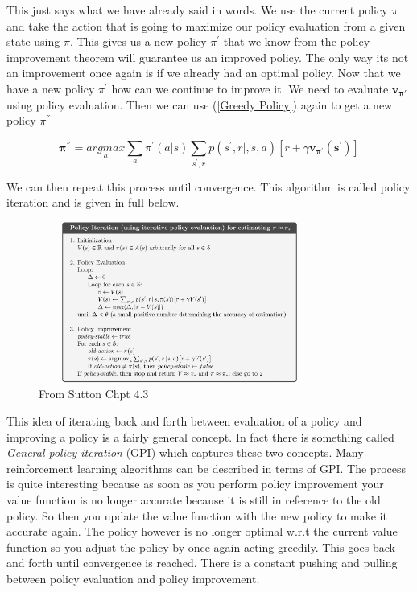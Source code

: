 This just says what we have already said in words. We use the current policy $\pi$ and take the action that is going to maximize our policy evaluation from a given state using $\pi$. This gives us a new policy $\pi^{'}$ that we know from the policy improvement theorem will guarantee us an improved policy. The only way its not an improvement once again is if we already had an optimal policy. Now that we have a new policy $\pi^{'}$ how can we continue to improve it. We need to evaluate $\mathbf{v_{\pi'}}$ using policy evaluation. Then we can use (\ref{Greedy Policy}) again to get a new policy $\pi^{''}$

$$ \mathbf{\pi^{''}} = \underset{a}{argmax}\underset{a}{\sum}\pi^{'}(a|s)\underset{s^{'},r}{\sum}p(s^{'},r|,s,a)[ r + \gamma \mathbf{v_{\pi^{'}}(s^{'})}]
$$

We can then repeat this process until convergence. This algorithm is called \textit{}{policy iteration} and is given in full below. 

 \begin{figure}[H]
        \centering
        \includegraphics[width=350px,height=200px]{images/policy_iteration.png}
        \caption{From Sutton Chpt 4.3}
        \label{fig:my_label}
    \end{figure}

This idea of iterating back and forth between evaluation of a policy and improving a policy is a fairly general concept. In fact there is something called \textit{General policy iteration} (GPI) which captures these two concepts. Many reinforcement learning algorithms can be described in terms of GPI. The process is quite interesting because as soon as you perform policy improvement your value function is no longer accurate because it is still in reference to the old policy. So then you update the value function with the new policy to make it accurate again. The policy however is no longer optimal w.r.t the current value function so you adjust the policy by once again acting greedily. This goes back and forth until convergence is reached. There is a constant pushing and pulling between policy evaluation and policy improvement. 



